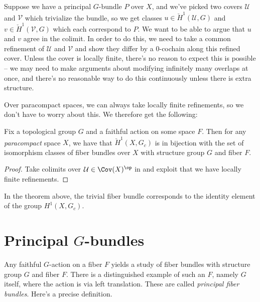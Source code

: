 \documentclass[11pt]{book}
\begin{document}
\begin{remark} Suppose we have a principal $G$-bundle $P$ over $X$, and we've picked two covers $\mathcal{U}$ and $\mathcal{V}$ which trivialize the bundle, so we get classes $u\in \check{H}^1(\mathcal{U},G)$ and $v \in \check{H}^1(\mathcal{V},G)$ which each correspond to $P$. We want to be able to argue that $u$ and $v$ agree in the colimit. In order to do this, we need to take a common refinement of $\mathcal{U}$ and $\mathcal{V}$ and show they differ by a 0-cochain along this refined cover. Unless the cover is locally finite, there's no reason to expect this is possible -- we may need to make arguments about modifying infinitely many overlaps at once, and there's no reasonable way to do this continuously unless there is extra structure.
\end{remark}

Over paracompact spaces, we can always take locally finite refinements, so we don't have to worry about this. We therefore get the following:

\begin{theorem}\label{thm:H1-bijection-with-fiber-bundles} 
Fix a topological group $G$ and a faithful action on some space $F$. Then for any \emph{paracompact} space $X$, we have that $\check{H}^1(X,G_c)$ is in bijection with the set of isomorphism classes of fiber bundles over $X$ with structure group $G$ and fiber $F$.
\end{theorem}
\begin{proof} Take colimits over $\mathcal{U}\in \Cov(X)^\op$ in  and exploit that we have locally finite refinements.
\end{proof}

\begin{example}
In the theorem above, the trivial fiber bundle corresponds to the identity element of the group $H^1(X,G_c)$.
\end{example}


\section{Principal $G$-bundles}

Any faithful $G$-action on a fiber $F$ yields a study of fiber bundles with structure group $G$ and fiber $F$. There is a distinguished example of such an $F$, namely $G$ itself, where the action is via left translation. These are called \emph{principal fiber bundles}. Here's a precise definition.
\end{document}
